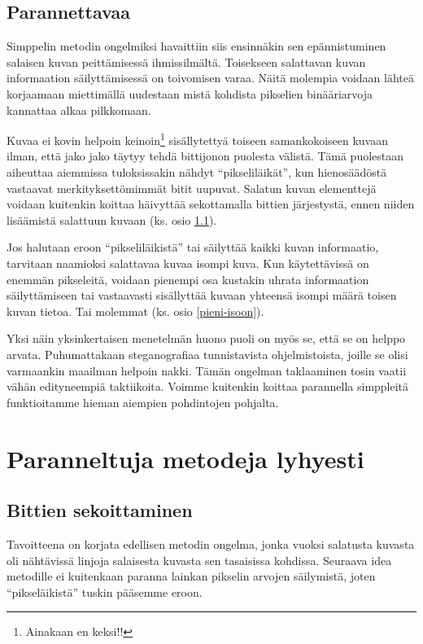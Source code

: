 \documentclass[a4paper,11pt]{article}
\begin{document}
\subsection{Parannettavaa}

Simppelin metodin ongelmiksi havaittiin siis ensinnäkin sen epännistuminen salaisen kuvan peittämisessä ihmissilmältä. Toisekseen salattavan kuvan informaation säilyttämisessä on toivomisen varaa. Näitä molempia voidaan lähteä korjaamaan miettimällä uudestaan mistä kohdista pikselien binääriarvoja kannattaa alkaa pilkkomaan.

Kuvaa ei kovin helpoin keinoin\footnote{Ainakaan en keksi!!} sisällytettyä toiseen samankokoiseen kuvaan ilman, että jako jako täytyy tehdä bittijonon puolesta välistä. Tämä puolestaan aiheuttaa aiemmissa tuloksissakin nähdyt \enquote{pikseliläikät}, kun hienosäädöstä vastaavat merkityksettömimmät bitit uupuvat. Salatun kuvan elementtejä voidaan kuitenkin koittaa häivyttää sekottamalla bittien järjestystä, ennen niiden lisäämistä salattuun kuvaan (ks. osio \ref{sekoitus}).

Jos halutaan eroon \enquote{pikseliläikistä} tai säilyttää kaikki kuvan informaatio, tarvitaan naamioksi salattavaa kuvaa isompi kuva. Kun käytettävissä on enemmän pikseleitä, voidaan pienempi osa kustakin uhrata informaation säilyttämiseen tai vastaavasti sisällyttää kuvaan yhteensä isompi määrä toisen kuvan tietoa. Tai molemmat (ks. osio \ref{pieni-isoon}).

Yksi näin yksinkertaisen menetelmän huono puoli on myös se, että se on helppo arvata. Puhumattakaan steganografiaa tunnistavista ohjelmistoista, joille se olisi varmaankin maailman helpoin nakki. Tämän ongelman taklaaminen tosin vaatii vähän edityneempiä taktiikoita. Voimme kuitenkin koittaa parannella simppleitä funktioitamme hieman aiempien pohdintojen pohjalta.

\section{Paranneltuja metodeja lyhyesti}
\subsection{Bittien sekoittaminen}
\label{sekoitus}

Tavoitteena on korjata edellisen metodin ongelma, jonka vuoksi salatusta kuvasta oli nähtävissä linjoja salaisesta kuvasta sen tasaisissa kohdissa. Seuraava idea metodille ei kuitenkaan paranna lainkan pikselin arvojen säilymistä, joten \enquote{pikseläikistä} tuskin pääsemme eroon.
\end{document}

